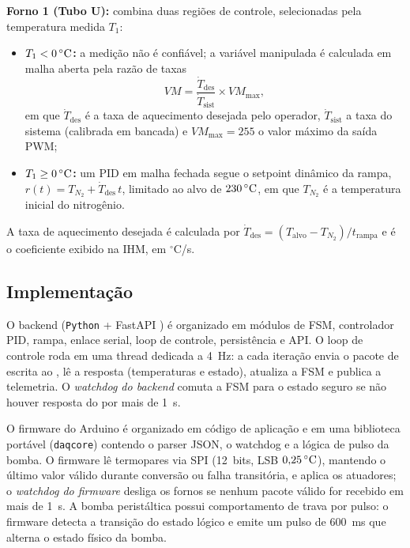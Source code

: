 \textbf{Forno 1 (Tubo U):} combina duas regi\~oes de controle, selecionadas pela
temperatura medida $T_1$:
\begin{itemize}
  \item \textbf{$T_1 < 0\,\celsius$:} a medi\c{c}\~ao n\~ao \'e confi\'avel; a
  vari\'avel manipulada \'e calculada em malha aberta pela raz\~ao de taxas
  \begin{equation}
    VM = \frac{\dot{T}_{\mathrm{des}}}{\dot{T}_{\mathrm{sist}}} \times VM_{\max},
    \label{eq:razao}
  \end{equation}
  em que $\dot{T}_{\mathrm{des}}$ \'e a taxa de aquecimento desejada pelo
  operador, $\dot{T}_{\mathrm{sist}}$ a taxa do sistema (calibrada em bancada) e
  $VM_{\max}=255$ o valor m\'aximo da sa\'ida PWM;
  \item \textbf{$T_1 \ge 0\,\celsius$:} um PID em malha fechada segue o setpoint
  din\^amico da rampa, $r(t)=T_{N_2}+\dot{T}_{\mathrm{des}}\,t$, limitado ao alvo
  de $230\,\celsius$, em que $T_{N_2}$ \'e a temperatura inicial do nitrog\^enio.
\end{itemize}

A taxa de aquecimento desejada \'e calculada por
$\dot{T}_{\mathrm{des}}=(T_{\mathrm{alvo}}-T_{N_2})/t_{\mathrm{rampa}}$ e \'e o
coeficiente exibido na IHM, em $^{\circ}$C/s.

\subsection{Implementa\c{c}\~ao}

O backend (\texttt{Python} + FastAPI \cite{fastapi}) \'e organizado em m\'odulos
de FSM, controlador PID, rampa, enlace serial, loop de controle, persist\^encia e
API. O loop de controle roda em uma thread dedicada a 4~Hz: a cada itera\c{c}\~ao
envia o pacote de escrita ao \daq, l\^e a resposta (temperaturas e estado),
atualiza a FSM e publica a telemetria. O \emph{watchdog do backend} comuta a FSM
para o estado seguro se n\~ao houver resposta do \daq por mais de 1~s.

O firmware do Arduino \'e organizado em c\'odigo de aplica\c{c}\~ao e em uma
biblioteca port\'avel (\texttt{daqcore}) contendo o parser JSON, o watchdog e a
l\'ogica de pulso da bomba. O firmware l\^e termopares via SPI (12~bits, LSB
$0{,}25\,\celsius$), mantendo o \'ultimo valor v\'alido durante convers\~ao ou
falha transit\'oria, e aplica os atuadores; o \emph{watchdog do firmware} desliga
os fornos se nenhum pacote v\'alido for recebido em mais de 1~s. A bomba
perist\'altica possui comportamento de trava por pulso: o firmware detecta a
transi\c{c}\~ao do estado l\'ogico e emite um pulso de $600$~ms que alterna o
estado f\'isico da bomba.

